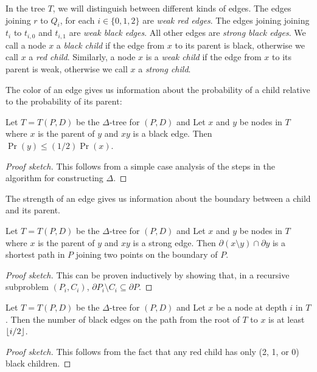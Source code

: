 \documentclass[lotsofwhite]{patmorin}
\newcommand{\boundary}{\partial}
\begin{document}
In the tree $T$, we will distinguish between different kinds of edges.
The edges joining $r$ to $Q_i$, for each $i\in\{0,1,2\}$ are
\emph{weak red edges}.  The edges joining joining $t_i$ to $t_{i,0}$
and $t_{i,1}$ are \emph{weak black edges}.  All other edges are
\emph{strong black edges}.  We call a node $x$ a \emph{black child} if
the edge from $x$ to its parent is black, otherwise we call $x$ a
\emph{red child}.  Similarly, a node $x$ is a \emph{weak child} if the
edge from $x$ to its parent is weak, otherwise we call $x$ a
\emph{strong child}.

The color of an edge gives us information about the probability of a
child relative to the probability of its parent:

\begin{lem}
Let $T=T(P,D)$ be the $\Delta$-tree for $(P,D)$ and
Let $x$ and $y$ be nodes in $T$ where $x$ is the parent of $y$ and
$xy$ is a black edge.  Then $\Pr(y)\le(1/2)\Pr(x)$.
\end{lem}


\begin{proof}[Proof sketch]
This follows from a simple case analysis of the steps in the algorithm for
constructing $\Delta$.
\end{proof}

The strength of an edge gives us information about the boundary
between a child and its parent.

\begin{lem}
Let $T=T(P,D)$ be the $\Delta$-tree for $(P,D)$ and
Let $x$ and $y$ be nodes in $T$ where $x$ is the parent of $y$ and
$xy$ is a strong edge.  Then $\boundary(x\setminus y)\cap\boundary y$
is a shortest path in $P$ joining two points on the boundary of $P$.
\end{lem}

\begin{proof}[Proof sketch]
This can be proven inductively by showing that, in a recursive
subproblem $(P_i,C_i)$, $\boundary P_i\setminus C_i\subseteq \boundary
P$.
\end{proof}

\begin{lem}
Let $T=T(P,D)$ be the $\Delta$-tree for $(P,D)$ and
Let $x$ be a node at depth $i$ in $T$.  Then the number of black edges
on the path from the root of $T$ to $x$ is at least $\left\lfloor i/2 \right\rfloor$.
\end{lem}

\begin{proof}[Proof sketch]
This follows from the fact that any red child has only (2,
1, or 0) black children.
\end{proof}
\end{document}

